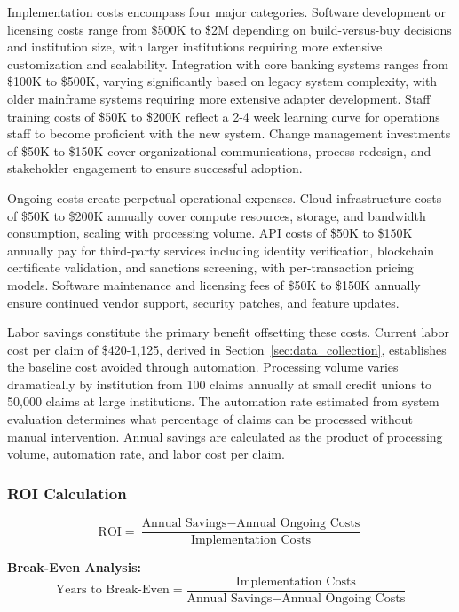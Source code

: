 Implementation costs encompass four major categories. Software development or licensing costs range from \$500K to \$2M depending on build-versus-buy decisions and institution size, with larger institutions requiring more extensive customization and scalability. Integration with core banking systems ranges from \$100K to \$500K, varying significantly based on legacy system complexity, with older mainframe systems requiring more extensive adapter development. Staff training costs of \$50K to \$200K reflect a 2-4 week learning curve for operations staff to become proficient with the new system. Change management investments of \$50K to \$150K cover organizational communications, process redesign, and stakeholder engagement to ensure successful adoption.

Ongoing costs create perpetual operational expenses. Cloud infrastructure costs of \$50K to \$200K annually cover compute resources, storage, and bandwidth consumption, scaling with processing volume. API costs of \$50K to \$150K annually pay for third-party services including identity verification, blockchain certificate validation, and sanctions screening, with per-transaction pricing models. Software maintenance and licensing fees of \$50K to \$150K annually ensure continued vendor support, security patches, and feature updates.

Labor savings constitute the primary benefit offsetting these costs. Current labor cost per claim of \$420-1,125, derived in Section~\ref{sec:data_collection}, establishes the baseline cost avoided through automation. Processing volume varies dramatically by institution from 100 claims annually at small credit unions to 50,000 claims at large institutions. The automation rate estimated from system evaluation determines what percentage of claims can be processed without manual intervention. Annual savings are calculated as the product of processing volume, automation rate, and labor cost per claim.

\subsubsection{ROI Calculation}

\begin{equation}
\text{ROI} = \frac{\text{Annual Savings} - \text{Annual Ongoing Costs}}{\text{Implementation Costs}}
\end{equation}

\textbf{Break-Even Analysis:}
\begin{equation}
\text{Years to Break-Even} = \frac{\text{Implementation Costs}}{\text{Annual Savings} - \text{Annual Ongoing Costs}}
\end{equation}


